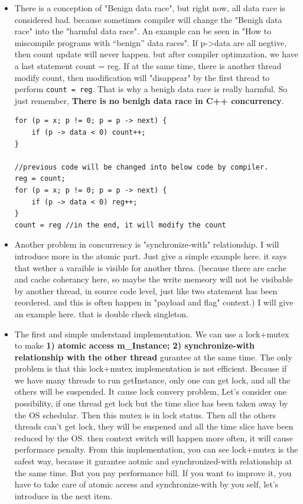 \documentclass[a4paper,11pt,twoside]{book}
\begin{document}
\begin{itemize}
    \item There is a conception of "Benign data race", but right now, all data race is considered bad. because sometimes compiler will change the "Benigh data race" into the "harmful data race". An example can be seen in "How to miscompile programs with “benign” data races". If p->data are all negtive, then count update will never happen. but after compiler optimzation, we have a last statement count = reg.  If at the same time, there is another thread modify count, then modification will "disappear" by the first thread to perform \texttt{count = reg}. That is why a benigh data race is really harmful. So just remember, \textbf{There is no benigh data race in C++ concurrency}.
\begin{lstlisting}[]
for (p = x; p != 0; p = p -> next) {
    if (p -> data < 0) count++;
} 

//previous code will be changed into below code by compiler.
reg = count;
for (p = x; p != 0; p = p -> next) {
    if (p -> data < 0) reg++;
}
count = reg //in the end, it will modify the count
\end{lstlisting}

    \item Another problem in concurrency is "synchronize-with" relationship. I will introduce more in the atomic part. Just give a simple example here. it says that wether a varaible is visible for another threa. (because there are cache and cache coherancy here, so maybe the write memeory will not be visibable by another thread, in source code level, just like two statement has been reordered. and this is often happen in "payload and flag" context.) I will give an example here. that is double check singleton.

    \item The first and simple understand implementation. We can use a lock+mutex to make \textbf{1) atomic access m\_Instance; 2) synchronize-with relationship with the other thread} gurantee at the same time. The only problem is that this lock+mutex implementation is not efficient.  Because if we have many threads to run getInstance, only one can get lock, and all the others will be suspended. It cause lock convery problem, Let's consider one possibility, if one thread get lock but the time slice has been taken away by the OS schedular. Then this mutex is in lock status. Then all the others threads can't get lock,  they will be suspened and all the time slice have been reduced by the OS. then context switch will happen more often, it will cause performace penalty.  From this implementation, you can see lock+mutex is the safest way, because it gurantee aotmic and synchronized-with relationship at the same time. But you pay performance bill. If you want to improve it, you have to take care of atomic access and synchronize-with by you self, let's introduce in the next item.


\end{itemize}
\end{document}
